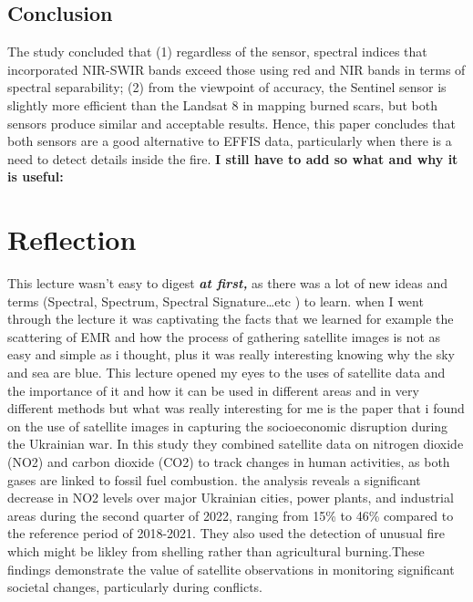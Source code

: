 \documentclass[
  letterpaper,
  DIV=11,
  numbers=noendperiod]{scrreprt}
\begin{document}
\hypertarget{conclusion}{%
\subsection{Conclusion}\label{conclusion}}

The study concluded that (1) regardless of the sensor, spectral indices
that incorporated NIR-SWIR bands exceed those using red and NIR bands in
terms of spectral separability; (2) from the viewpoint of accuracy, the
Sentinel sensor is slightly more efficient than the Landsat 8 in mapping
burned scars, but both sensors produce similar and acceptable results.
Hence, this paper concludes that both sensors are a good alternative to
EFFIS data, particularly when there is a need to detect details inside
the fire. \textbf{I still have to add so what and why it is useful:}

\hypertarget{reflection}{%
\section{Reflection}\label{reflection}}

This lecture wasn't easy to digest \textbf{\emph{at first,}} as there
was a lot of new ideas and terms (Spectral, Spectrum, Spectral
Signature\ldots etc ) to learn. when I went through the lecture it was
captivating the facts that we learned for example the scattering of EMR
and how the process of gathering satellite images is not as easy and
simple as i thought, plus it was really interesting knowing why the sky
and sea are blue. This lecture opened my eyes to the uses of satellite
data and the importance of it and how it can be used in different areas
and in very different methods but what was really interesting for me is
the paper that i found on the use of satellite images in capturing the
socioeconomic disruption during the Ukrainian war. In this study they
combined satellite data on nitrogen dioxide (NO2) and carbon dioxide
(CO2) to track changes in human activities, as both gases are linked to
fossil fuel combustion. the analysis reveals a significant decrease in
NO2 levels over major Ukrainian cities, power plants, and industrial
areas during the second quarter of 2022, ranging from 15\% to 46\%
compared to the reference period of 2018-2021. They also used the
detection of unusual fire which might be likley from shelling rather
than agricultural burning.These findings demonstrate the value of
satellite observations in monitoring significant societal changes,
particularly during conflicts.
\end{document}
